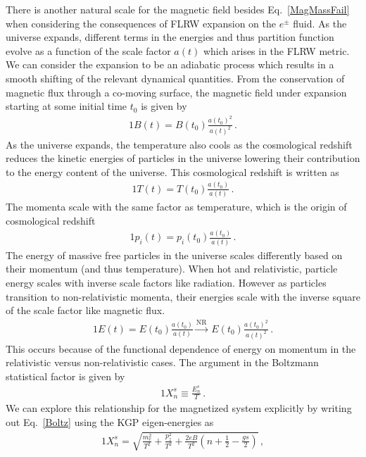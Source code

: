 \documentclass[Universe,article,submit,moreauthors,pdftex]{Definitions/mdpi}
\newcommand*{\req}[1]{Eq.~{\eqref{#1}}}
\begin{document}
There is another natural scale for the magnetic field besides \req{MagMassFail} when considering the consequences of FLRW expansion on the $e^{\pm}$ fluid. As the universe expands, different terms in the energies and thus partition function evolve as a function of the scale factor $a(t)$ which arises in the FLRW metric. We can consider the expansion to be an adiabatic process which results in a smooth shifting of the relevant dynamical quantities. From the conservation of magnetic flux through a co-moving surface, the magnetic field under expansion starting at some initial time $t_{0}$ is given by
\begin{alignat}{1}
    \label{BScale} B(t) = B(t_{0})\frac{a(t_{0})^{2}}{a(t)^{2}}\,.
\end{alignat}
As the universe expands, the temperature also cools as the cosmological redshift reduces the kinetic energies of particles in the universe lowering their contribution to the energy content of the universe. This cosmological redshift is written as
\begin{alignat}{1}
    \label{TScale} T(t) = T(t_{0})\frac{a(t_{0})}{a(t)}\,.
\end{alignat}
The momenta scale with the same factor as temperature, which is the origin of cosmological redshift
\begin{alignat}{1}
    \label{PScale} p_{i}(t) = p_{i}(t_{0})\frac{a(t_{0})}{a(t)}\,.
\end{alignat}
The energy of massive free particles in the universe scales differently based on their momentum (and thus temperature). When hot and relativistic, particle energy scales with inverse scale factors like radiation. However as particles transition to non-relativistic momenta, their energies scale with the inverse square of the scale factor like magnetic flux.
\begin{alignat}{1}
    \label{EScale} E(t) = E(t_{0})\frac{a(t_{0})}{a(t)}\xrightarrow{\mathrm{NR}}\  E(t_{0})\frac{a(t_{0})^{2}}{a(t)^{2}}\,.
\end{alignat}
This occurs because of the functional dependence of energy on momentum in the relativistic versus non-relativistic cases. The argument in the Boltzmann statistical factor is given by
\begin{alignat}{1}
    \label{Boltz} X_{n}^{s}\equiv\frac{E_{n}^{s}}{T}\,.
\end{alignat}
We can explore this relationship for the magnetized system explicitly by writing out \req{Boltz} using the KGP eigen-energies as
\begin{alignat}{1}
    \label{XExplicit} X_{n}^{s} = \sqrt{\frac{m_{e}^{2}}{T^{2}}+\frac{p_{z}^{2}}{T^{2}}+\frac{2eB}{T^{2}}\left(n+\frac{1}{2}-\frac{gs}{2}\right)}\,,
\end{alignat}
\end{document}
